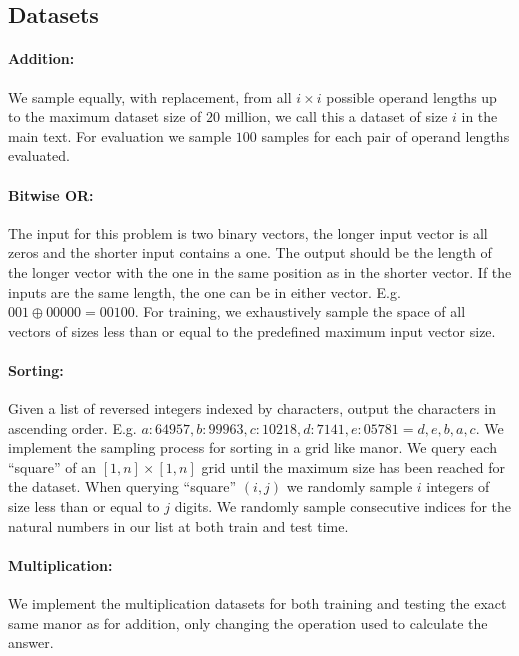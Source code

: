 \documentclass{article}
\begin{document}
\subsection{Datasets}
\label{app-subsec:datasets}
\paragraph{Addition:}
We sample equally, with replacement, from all \(i\times i\) possible operand lengths up to the maximum dataset size of \(20\) million, we call this a dataset of size \(i\) in the main text.
For evaluation we sample \(100\) samples for each pair of operand lengths evaluated.

\paragraph{Bitwise OR:} 
The input for this problem is two binary vectors, the longer input vector is all zeros and the shorter input contains a one. 
The output should be the length of the longer vector with the one in the same position as in the shorter vector. 
If the inputs are the same length, the one can be in either vector. 
E.g. \(001 \oplus 00000 = 00100\).
For training, we exhaustively sample the space of all vectors of sizes less than or equal to the predefined maximum input vector size.

\paragraph{Sorting:} 
Given a list of reversed integers indexed by characters, output the characters in ascending order. E.g. \(a:64957,b:99963,c:10218,d:7141,e:05781=d,e,b,a,c\).
We implement the sampling process for sorting in a grid like manor.
We query each ``square'' of an \([1,n]\times[1,n]\) grid until the maximum size has been reached for the dataset.
When querying ``square'' \((i,j)\) we randomly sample \(i\) integers of size less than or equal to \(j\) digits.
We randomly sample consecutive indices for the natural numbers in our list at both train and test time.

\paragraph{Multiplication:}
We implement the multiplication datasets for both training and testing the exact same manor as for addition, only changing the operation used to calculate the answer.
\end{document}
